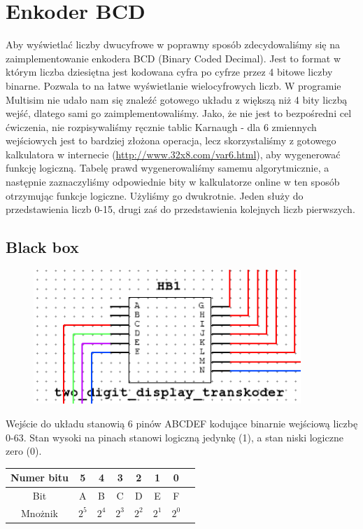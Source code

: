 \documentclass[a4paper]{article}
\begin{document}
\section{Enkoder BCD}
Aby wyświetlać liczby dwucyfrowe w poprawny sposób zdecydowaliśmy się na zaimplementowanie enkodera BCD (Binary Coded Decimal). Jest to format
w którym liczba dziesiętna jest kodowana cyfra po cyfrze przez 4 bitowe liczby binarne. Pozwala to na łatwe wyświetlanie wielocyfrowych liczb.
W programie Multisim nie udało nam się znaleźć gotowego układu z większą niż 4 bity liczbą wejść, dlatego sami go zaimplementowaliśmy. Jako, że 
nie jest to bezpośredni cel ćwiczenia, nie rozpisywaliśmy ręcznie tablic Karnaugh - dla 6 zmiennych wejściowych jest to bardziej złożona operacja, lecz
skorzystaliśmy z gotowego kalkulatora w internecie (\url{http://www.32x8.com/var6.html}), aby wygenerować funkcję logiczną. Tabelę prawd wygenerowaliśmy samemu algorytmicznie, a następnie
zaznaczyliśmy odpowiednie bity w kalkulatorze online w ten sposób otrzymując funkcje logiczne. Użyliśmy go dwukrotnie. Jeden służy do przedstawienia liczb 0-15,
 drugi zaś do przedstawienia kolejnych liczb pierwszych. 
\subsection{Black box}
\begin{figure}[H]
  \centering
  \includegraphics[width=0.9\textwidth]{black_box2.png}
\end{figure}

Wejście do układu stanowią 6 pinów ABCDEF kodujące binarnie wejściową liczbę 0-63. Stan wysoki na pinach
stanowi logiczną jedynkę (1), a stan niski logiczne zero (0).
\begin{center}
  \begin{tabular}{|c|c|c|c|c|c|c|c|}
    \hline Numer bitu & 5 & 4 & 3 & 2 & 1 & 0 \\ 
    \hline Bit & A & B & C & D & E & F  \\
    \hline Mnożnik &$2^5$ &$2^4$ & $2^3$ & $2^2$ & $2^1$ & $2^0$  \\
    \hline
  \end{tabular}
\end{center}
\end{document}
